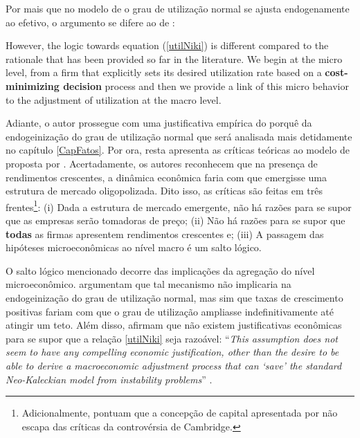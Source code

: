 Por mais que no modelo de \textcite{nikiforos_utilization_2016} o grau de utilização normal se ajusta endogenamente ao efetivo, o argumento se difere ao de \textcites{amadeo_role_1986}:
\begin{citacao}
However, the logic towards equation (\ref{utilNiki}) is different compared to the rationale that has been provided so far in the literature. We begin at the micro level, from a firm that explicitly sets its desired utilization rate based on a \textbf{cost-minimizing decision} process and then we provide a link of this micro behavior to the adjustment of utilization at the macro level. \cite[p.~456, grifos adicionados e numeração adaptada]{nikiforos_utilization_2016}
\end{citacao}
Adiante, o autor prossegue com uma justificativa empírica do porquê da endogeinização do grau de utilização normal que será analisada mais detidamente no capítulo \ref{CapFatos}. Por ora, resta apresenta as críticas teóricas ao modelo de \textcites{nikiforos_utilization_2016} proposta por \textcites{girardi_normal_2018}. Acertadamente, os autores reconhecem que na presença de rendimentos crescentes, a dinâmica econômica faria com que emergisse uma estrutura de mercado oligopolizada. Dito isso, as críticas são feitas em três frentes\footnote{Adicionalmente, \textcite{girardi_normal_2018} pontuam que a concepção de capital apresentada por \textcites{nikiforos_utilization_2016} não escapa das críticas da controvérsia de Cambridge.}: (i) Dada a estrutura de mercado emergente, não há razões para se supor que as empresas serão tomadoras de preço; (ii) Não há razões para se supor que \textbf{todas} as firmas apresentem rendimentos crescentes e; (iii) A passagem das hipóteses microeconômicas ao nível macro é um salto lógico. 

O salto lógico mencionado decorre das implicações da agregação do nível microeconômico. \textcites{girardi_normal_2018} argumentam que tal mecanismo não implicaria na endogeinização do grau de utilização normal, mas sim que taxas de crescimento positivas fariam com que o grau de utilização ampliasse indefinitivamente até atingir um teto. Além disso, afirmam que não existem justificativas econômicas para se supor que a relação \ref{utilNiki} seja razoável: ``\textit{This assumption does not seem to have any compelling economic justification, other than the desire to be able to derive a macroeconomic adjustment process that can `save' the standard Neo-Kaleckian model from instability problems}'' \cite[p.~15]{girardi_normal_2018}.


